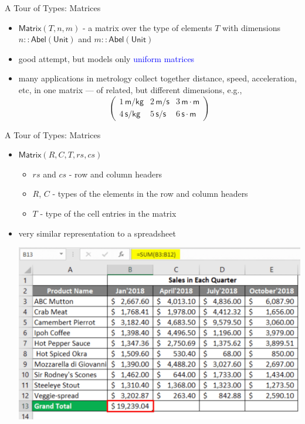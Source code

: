 \documentclass[]{beamer}
\newcommand{\keyword}[1]{\textcolor{blue}{#1}}
\newcommand{\Unit}{\mathsf{Unit}}
\newcommand{\Abel}{\mathsf{Abel}}
\newcommand{\Matrix}{\mathsf{Matrix}}
\newcommand{\Kg}{\mathsf{kg}}
\newcommand{\Sec}{\mathsf{s}}
\newcommand{\Km}{\mathsf{m}}
\begin{document}
\begin{frame}[fragile]{A Tour of Types: Matrices}
\begin{itemize}[<+->]
  \item $\Matrix(T, n, m)$ - a matrix over the type of elements $T$ with dimensions $n :: \Abel(\Unit)$ and $m :: \Abel(\Unit)$
  \item good attempt, but models only \keyword{uniform matrices}
  \item many applications in metrology collect together distance, speed, acceleration, etc, in one matrix — of related, but different dimensions, e.g.,
  \[\begin{pmatrix}
    1\, \Km/\Kg & 2\, \Km/\Sec & 3\, \Km \cdot \Km \\
    4\, \Sec/\Kg & 5\, \Sec/\Sec & 6\, \Sec \cdot \Km
  \end{pmatrix}\]
\end{itemize}
\end{frame}

\begin{frame}[fragile]{A Tour of Types: Matrices}
\begin{itemize}[<+->]
  \item $\Matrix(R, C, T, rs, cs)$
  \begin{itemize}
  \item $rs$ and $cs$ - row and column headers
  \item $R$, $C$ - types of the elements in the row and column headers
  \item $T$ - type of the cell entries in the matrix
  \end{itemize}
  \item very similar representation to a spreadsheet
  \begin{center}
    \includegraphics[width=0.7\linewidth]{spreadsheet}
  \end{center}

\end{itemize}
\end{frame}
\end{document}
